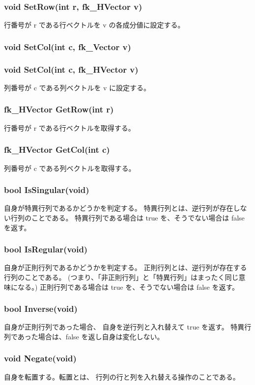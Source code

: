 \subsubsection*{void SetRow(int r, fk\_HVector v)}
行番号が r である行ベクトルを v の各成分値に設定する。

\subsubsection*{void SetCol(int c, fk\_Vector v)}
\subsubsection*{void SetCol(int c, fk\_HVector v)}
列番号が c である列ベクトルを v に設定する。

\subsubsection*{fk\_HVector GetRow(int r)}
行番号が r である行ベクトルを取得する。

\subsubsection*{fk\_HVector GetCol(int c)}
列番号が c である列ベクトルを取得する。

\subsubsection*{bool IsSingular(void)}
自身が特異行列であるかどうかを判定する。
特異行列とは、逆行列が存在しない行列のことである。
特異行列である場合は true を、そうでない場合は false を返す。

\subsubsection*{bool IsRegular(void)}
自身が正則行列であるかどうかを判定する。
正則行列とは、逆行列が存在する行列のことである。
(つまり、「非正則行列」と「特異行列」はまったく同じ意味になる。)
正則行列である場合は true を、そうでない場合は false を返す。

\subsubsection*{bool Inverse(void)}
自身が正則行列であった場合、
自身を逆行列と入れ替えて true を返す。
特異行列であった場合は、false を返し自身は変化しない。

\subsubsection*{void Negate(void)}
自身を転置する。転置とは、
行列の行と列を入れ替える操作のことである。

